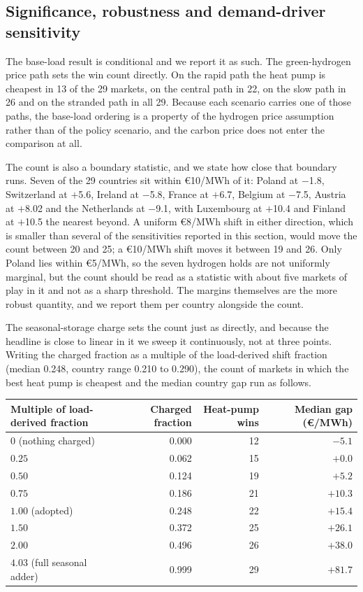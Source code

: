 \subsection{Significance, robustness and demand-driver sensitivity}
\label{sec:results:robustness}

The base-load result is conditional and we report it as such. The green-hydrogen price
path sets the win count directly. On the rapid path the heat pump is cheapest in 13 of
the 29 markets, on the central path in 22, on the slow path in 26 and on the stranded
path in all 29. Because each scenario carries one of those paths, the base-load
ordering is a property of the hydrogen price assumption rather than of the policy
scenario, and the carbon price does not enter the comparison at all.

The count is also a boundary statistic, and we state how close that boundary runs.
Seven of the 29 countries sit within \euro{}10/MWh of it: Poland at $-$1.8, Switzerland
at $+$5.6, Ireland at $-$5.8, France at $+$6.7, Belgium at $-$7.5, Austria at $+$8.02 and
the Netherlands at $-$9.1, with Luxembourg at $+$10.4 and Finland at $+$10.5 the
nearest beyond. A uniform \euro{}8/MWh shift in either direction, which is
smaller than several of the sensitivities reported in this section, would move the count
between 20 and 25; a \euro{}10/MWh shift moves it between 19 and 26. Only Poland lies
within \euro{}5/MWh, so the seven hydrogen holds are not uniformly marginal, but the
count should be read as a statistic with about five markets of play in it and not as
a sharp threshold. The margins themselves are the more robust quantity, and we report
them per country alongside the count.

The seasonal-storage charge sets the count just as directly, and because the headline is
close to linear in it we sweep it continuously, not at three points. Writing the charged fraction as a
multiple of the load-derived shift fraction (median 0.248, country range 0.210 to
0.290), the count of markets in which the best heat pump is cheapest and the median
country gap run as follows.

\begin{center}
\small
\begin{tabular}{lrrr}
\toprule
Multiple of load-derived fraction & Charged fraction & Heat-pump wins & Median gap (\euro{}/MWh) \\
\midrule
$0$ (nothing charged)      & 0.000 & 12 & $-5.1$ \\
$0.25$                      & 0.062 & 15 & $+0.0$ \\
$0.50$                      & 0.124 & 19 & $+5.2$ \\
$0.75$                      & 0.186 & 21 & $+10.3$ \\
$1.00$ (adopted)            & 0.248 & 22 & $+15.4$ \\
$1.50$                      & 0.372 & 25 & $+26.1$ \\
$2.00$                      & 0.496 & 26 & $+38.0$ \\
$4.03$ (full seasonal adder)& 0.999 & 29 & $+81.7$ \\
\bottomrule
\end{tabular}
\end{center}

